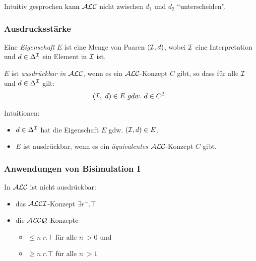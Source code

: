 Intuitiv gesprochen kann $\mathcal{A}\mathcal{L}\mathcal{C}$ nicht zwischen $d_1$ und $d_2$ \enquote{unterscheiden}.

\subsubsection{Ausdrucksstärke}\label{ausdrucksstuxe4rke}

\begin{definition}

Eine \emph{Eigenschaft} $E$ ist eine Menge von Paaren $(\mathcal{I},d)$, wobei
$\mathcal{I}$ eine Interpretation und $d \in \Delta^{\mathcal{I}}$ ein Element in $\mathcal{I}$ ist.

$E$ ist \emph{ausdrückbar in $\mathcal{A}\mathcal{L}\mathcal{C}$}, wenn es ein $\mathcal{A}\mathcal{L}\mathcal{C}$-Konzept $C$
gibt, so dass für alle $\mathcal{I}$ und $d \in \Delta^{\mathcal{I}}$ gilt: \begin{align*}
\left( \MI,\ d \right) \in E\ gdw.\ d \in C^\MI
\end{align*}
\end{definition}

Intuitionen:
\begin{itemize}
    \item $d \in \Delta^{\mathcal{I}}$ hat die Eigenschaft $E$ gdw. $(\mathcal{I}, d) \in E$.
    \item $E$ ist ausdrückbar, wenn es ein \emph{äquivalentes} $\mathcal{A}\mathcal{L}\mathcal{C}$-Konzept $C$ gibt.
\end{itemize}

\subsubsection{Anwendungen von Bisimulation I}\label{theorem-3.4}

\begin{theorem}
    \label{thm:beschraenkt}
In $\mathcal{A}\mathcal{L}\mathcal{C}$ ist nicht ausdrückbar: 
\begin{itemize}
\item das $\mathcal{A}\mathcal{L}\mathcal{C}\mathcal{I}$-Konzept $\exists r^{-}.\top$ 
\item die $\mathcal{A}\mathcal{L}\mathcal{C}\mathcal{Q}$-Konzepte
\begin{itemize}
  \item $\leq n\ r.\top$ für alle $n\ > 0$ und
  \item $\geq n\ r.\top$ für alle $n\ > 1$
\end{itemize}
\end{itemize}
\end{theorem}


